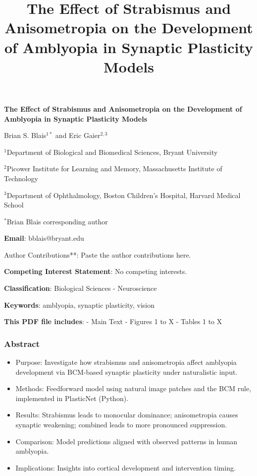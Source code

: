 \documentclass[
]{article}
\title{The Effect of Strabismus and Anisometropia on the Development of
Amblyopia in Synaptic Plasticity Models}
\author{}
\date{}
\providecommand{\tightlist}{%
  \setlength{\itemsep}{0pt}\setlength{\parskip}{0pt}}
\begin{document}
\maketitle

\textbf{The Effect of Strabismus and Anisometropia on the Development of
Amblyopia in Synaptic Plasticity Models}

Brian S. Blais\(^{1*}\) and Eric Gaier\(^{2,3}\)

\(^{1}\)Department of Biological and Biomedical Sciences, Bryant
University

\(^{2}\)Picower Institute for Learning and Memory, Massachusetts
Institute of Technology

\(^{3}\)Department of Ophthalmology, Boston Children's Hospital, Harvard
Medical School

\(^{*}\)Brian Blais corresponding author

\textbf{Email}: bblais@bryant.edu

Author Contributions**: Paste the author contributions here.

\textbf{Competing Interest Statement}: No competing interests.

\textbf{Classification}: Biological Sciences - Neuroscience

\textbf{Keywords}: amblyopia, synaptic plasticity, vision

\textbf{This PDF file includes}: - Main Text - Figures 1 to X - Tables 1
to X

\subsubsection{Abstract}\label{sec:abstract}

\begin{itemize}
\tightlist
\item[$\boxtimes$]
  Purpose: Investigate how strabismus and anisometropia affect amblyopia
  development via BCM-based synaptic plasticity under naturalistic
  input.
\item[$\boxtimes$]
  Methods: Feedforward model using natural image patches and the BCM
  rule, implemented in PlasticNet (Python).
\item[$\boxtimes$]
  Results: Strabismus leads to monocular dominance; anisometropia causes
  synaptic weakening; combined leads to more pronounced suppression.
\item[$\boxtimes$]
  Comparison: Model predictions aligned with observed patterns in human
  amblyopia.
\item[$\boxtimes$]
  Implications: Insights into cortical development and intervention
  timing.
\end{itemize}
\end{document}
